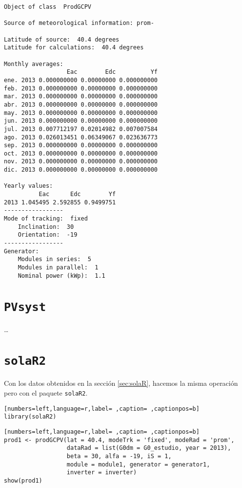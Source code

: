 \begin{verbatim}
Object of class  ProdGCPV 

Source of meteorological information: prom- 

Latitude of source:  40.4 degrees
Latitude for calculations:  40.4 degrees

Monthly averages:
                  Eac        Edc          Yf
ene. 2013 0.000000000 0.00000000 0.000000000
feb. 2013 0.000000000 0.00000000 0.000000000
mar. 2013 0.000000000 0.00000000 0.000000000
abr. 2013 0.000000000 0.00000000 0.000000000
may. 2013 0.000000000 0.00000000 0.000000000
jun. 2013 0.000000000 0.00000000 0.000000000
jul. 2013 0.007712197 0.02014982 0.007007584
ago. 2013 0.026013451 0.06349067 0.023636773
sep. 2013 0.000000000 0.00000000 0.000000000
oct. 2013 0.000000000 0.00000000 0.000000000
nov. 2013 0.000000000 0.00000000 0.000000000
dic. 2013 0.000000000 0.00000000 0.000000000

Yearly values:
          Eac      Edc        Yf
2013 1.045495 2.592855 0.9499751
-----------------
Mode of tracking:  fixed 
    Inclination:  30 
    Orientation:  -19 
-----------------
Generator:
    Modules in series:  5 
    Modules in parallel:  1 
    Nominal power (kWp):  1.1
\end{verbatim}

\section{\texttt{PVsyst}}
\label{sec:org2fbc53f}

\ldots{}


\section{\texttt{solaR2}}
\label{sec:orga52f088}
\label{sec:solaR2}
Con los datos obtenidos en la sección \ref{sec:solaR}, hacemos la misma operación pero con el paquete \texttt{solaR2}.
\begin{lstlisting}[numbers=left,language=r,label= ,caption= ,captionpos=b]
library(solaR2)
\end{lstlisting}

\begin{lstlisting}[numbers=left,language=r,label= ,caption= ,captionpos=b]
prod1 <- prodGCPV(lat = 40.4, modeTrk = 'fixed', modeRad = 'prom',
                  dataRad = list(G0dm = G0_estudio, year = 2013),
                  beta = 30, alfa = -19, iS = 1,
                  module = module1, generator = generator1,
                  inverter = inverter)
show(prod1)
\end{lstlisting}

